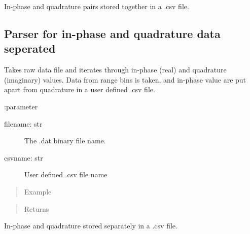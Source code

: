 \documentclass[letterpaper,10pt,english]{sphinxmanual}
\begin{document}
\begin{fulllineitems}
\begin{quote}
\begin{description}
\end{description}\end{quote}

In-phase and quadrature pairs stored together in a .csv file.

\end{fulllineitems}



\subsection{Parser for in-phase and quadrature data seperated}
\label{\detokenize{X4 parser:module-X4_parser}}\label{\detokenize{X4 parser:parser-for-in-phase-and-quadrature-data-seperated}}

\begin{fulllineitems}
\label{\detokenize{X4 parser:X4_parser.raw_data}}
Takes raw data file and iterates through in-phase (real) and quadrature (imaginary) values.
Data from range bins is taken, and in-phase value are put apart from quadrature in a user defined .csv file.

:parameter
\begin{description}
\item[{filename: str}] \leavevmode
The .dat binary file name.

\item[{csvname: str}] \leavevmode
User defined .csv file name

\end{description}
\begin{quote}\begin{description}
\item[{Example}] \leavevmode
\end{description}\end{quote}

%
\begin{sphinxVerbatim}[commandchars=\\\{\}]
\end{sphinxVerbatim}
\begin{quote}\begin{description}
\item[{Returns}] \leavevmode


\end{description}\end{quote}

In-phase and quadrature stored separately in a .csv file.

\end{fulllineitems}
\end{document}
